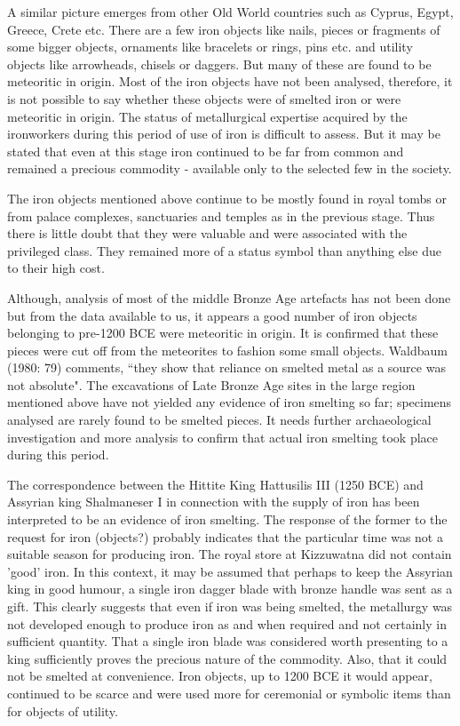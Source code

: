 {A similar picture emerges from other Old World countries such as Cyprus, Egypt, Greece, Crete etc. There are a few iron objects like nails, pieces or fragments of some bigger objects, ornaments like bracelets or rings, pins etc. and utility objects like arrowheads, chisels or daggers. But many of these are found to be meteoritic in origin. Most of the iron objects have not been analysed, therefore, it is not possible to say whether these objects were of smelted iron or were meteoritic in origin. The status of metallurgical expertise acquired by the ironworkers during this period of use of iron is difficult to assess. But it may be stated that even at this stage iron continued to be far from common and remained a precious commodity - available only to the selected few in the society.

The iron objects mentioned above continue to be mostly found in royal tombs or from palace complexes, sanctuaries and temples as in the previous stage. Thus there is little doubt that they were valuable and were associated with the privileged class. They remained more of a status symbol than anything else due to their high cost.

Although, analysis of most of the middle Bronze Age artefacts has not been done but from the data available to us, it appears a good number of iron objects belonging to pre-1200 BCE were meteoritic in origin. It is confirmed that these pieces were cut off from the meteorites to fashion some small objects. Waldbaum (1980: 79) comments, ``they show that reliance on smelted metal as a source was not absolute". The excavations of Late Bronze Age sites in the large region mentioned above have not yielded any evidence of iron smelting so far; specimens analysed are rarely found to be smelted pieces. It needs further archaeological investigation and more analysis to confirm that actual iron smelting took place during this period.

The correspondence between the Hittite King Hattusilis III (1250 BCE) and Assyrian king Shalmaneser I in connection with the supply of iron has been interpreted to be an evidence of iron smelting. The response of the former to the request for iron (objects?) probably indicates that the particular time was not a suitable season for producing iron. The royal store at Kizzuwatna did not contain 'good' iron. In this context, it may be assumed that perhaps to keep the Assyrian king in good humour, a single iron dagger blade with bronze handle was sent as a gift. This clearly suggests that even if iron was being smelted, the metallurgy was not developed enough to produce iron as and when required and not certainly in sufficient quantity. That a single iron blade was considered worth presenting to a king sufficiently proves the precious nature of the commodity. Also, that it could not be smelted at convenience. Iron objects, up to 1200 BCE it would appear, continued to be scarce and were used more for ceremonial or symbolic items than for objects of utility.

}
